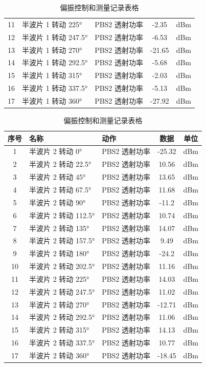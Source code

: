 \begin{enumerate}
\begin{table}[htbp]
{\begin{tabular}{|c|l|l|c|c|}
			11 & 半波片 1 转动 225° & PBS2 透射功率 & -2.35 & dBm \\
			12 & 半波片 1 转动 247.5° & PBS2 透射功率 & -6.53 & dBm \\
			13 & 半波片 1 转动 270° & PBS2 透射功率 & -21.65 & dBm \\
			14 & 半波片 1 转动 292.5° & PBS2 透射功率 & -5.68 & dBm \\
			15 & 半波片 1 转动 315° & PBS2 透射功率 & -2.03 & dBm \\
			16 & 半波片 1 转动 337.5° & PBS2 透射功率 & -5.13 & dBm \\
			17 & 半波片 1 转动 360° & PBS2 透射功率 & -27.92 & dBm \\
			\hline
		\end{tabular}
	\quad
		\begin{tabular}{|c|l|l|c|c|}
			\hline
			序号 & 名称 & 动作 & 数据 & 单位 \\
			\hline
			1 & 半波片 2 转动 0° & PBS2 透射功率 & -25.32 & dBm \\
			2 & 半波片 2 转动 22.5° & PBS2 透射功率 & 10.56 & dBm \\
			3 & 半波片 2 转动 45° & PBS2 透射功率 & 13.65 & dBm \\
			4 & 半波片 2 转动 67.5° & PBS2 透射功率 & 11.68 & dBm \\
			5 & 半波片 2 转动 90° & PBS2 透射功率 & -11.2 & dBm \\
			6 & 半波片 2 转动 112.5° & PBS2 透射功率 & 10.74 & dBm \\
			7 & 半波片 2 转动 135° & PBS2 透射功率 & 14.07 & dBm \\
			8 & 半波片 2 转动 157.5° & PBS2 透射功率 & 9.49 & dBm \\
			9 & 半波片 2 转动 180° & PBS2 透射功率 & -24.2 & dBm \\
			10 & 半波片 2 转动 202.5° & PBS2 透射功率 & 11.16 & dBm \\
			11 & 半波片 2 转动 225° & PBS2 透射功率 & 14.03 & dBm \\
			12 & 半波片 2 转动 247.5° & PBS2 透射功率 & 11.02 & dBm \\
			13 & 半波片 2 转动 270° & PBS2 透射功率 & -12.71 & dBm \\
			14 & 半波片 2 转动 292.5° & PBS2 透射功率 & 11.06 & dBm \\
			15 & 半波片 2 转动 315° & PBS2 透射功率 & 14.13 & dBm \\
			16 & 半波片 2 转动 337.5° & PBS2 透射功率 & 10.77 & dBm \\
			17 & 半波片 2 转动 360° & PBS2 透射功率 & -18.45 & dBm \\
			\hline
		\end{tabular}
	}
	\caption{偏振控制和测量记录表格}
		\label{tab:tab1}
	\end{table}
	

\end{enumerate}

